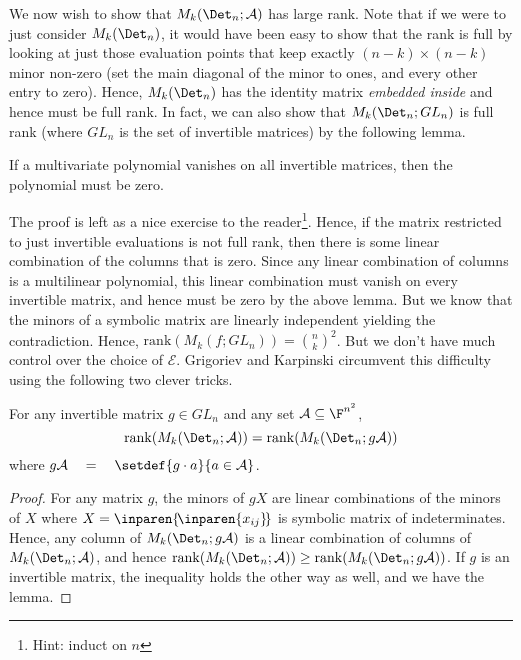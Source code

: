 We now wish to show that $M_k(\Det_n;\mathcal{A})$ has large
rank. Note that if we were to just consider $M_k(\Det_n)$, it would
have been easy to show that the rank is full by looking at just those
evaluation points that keep exactly $(n-k)\times (n-k)$ minor non-zero
(set the main diagonal of the minor to ones, and every other entry to
zero). Hence, $M_k(\Det_n)$ has the identity matrix \emph{embedded
  inside} and hence must be full rank. In fact, we can also show that
$M_k(\Det_n; GL_n)$ is full rank (where $GL_n$ is the set of
invertible matrices) by the following lemma.

\begin{lemma}
  If a multivariate polynomial vanishes on all invertible matrices,
  then the polynomial must be zero.
\end{lemma}

The proof is left as a nice exercise to the reader\footnote{Hint:
  induct on $n$}. Hence, if the matrix restricted to just invertible
evaluations is not full rank, then there is some linear combination of
the columns that is zero. Since any linear combination of columns is a
multilinear polynomial, this linear combination must vanish on every
invertible matrix, and hence must be zero by the above lemma. But we
know that the minors of a symbolic matrix are linearly independent
yielding the contradiction. Hence, $\mathrm{rank}(M_k(f;GL_n)) =
\binom{n}{k}^2$. But we don't have much control over the choice of
$\mathcal{E}$. Grigoriev and Karpinski circumvent this difficulty
using the following two clever tricks.

\begin{lemma}\label{lem:gk-invertible-same-rank}
  For any invertible matrix $g\in GL_n$ and any set $\mathcal{A}\subseteq \F^{n^2}$, 
  $$
  \mathrm{rank}(M_k(\Det_n;\mathcal{A})) = \mathrm{rank}(M_k(\Det_n;g\mathcal{A}))
  $$
  where $g\mathcal{A} \quad=\quad \setdef{g \cdot a}{a\in \mathcal{A}}$.
\end{lemma}
\begin{proof}
  For any matrix $g$, the minors of $gX$ are linear combinations of
  the minors of $X$ where $X = \inparen{\!\inparen{x_{ij}}\!}$ is
  symbolic matrix of indeterminates. Hence, any column of
  $M_k(\Det_n;g\mathcal{A})$ is a linear combination of columns of
  $M_k(\Det_n;\mathcal{A})$, and hence
  $\mathrm{rank}(M_k(\Det_n;\mathcal{A})) \geq
  \mathrm{rank}(M_k(\Det_n;g\mathcal{A}))$. If $g$ is an invertible
  matrix, the inequality holds the other way as well, and we have the
  lemma.
\end{proof}


